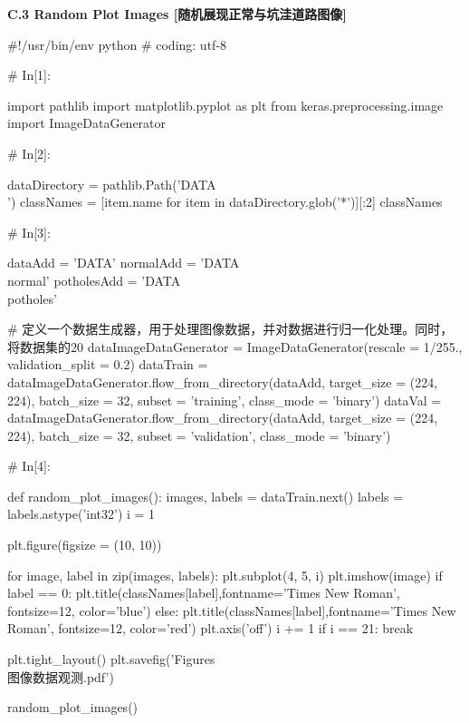 \documentclass{MathorCupmodeling}
\begin{document}
\textbf{C.3 Random Plot Images [随机展现正常与坑洼道路图像]}
\begin{python}
#!/usr/bin/env python
# coding: utf-8

# In[1]:


import pathlib
import matplotlib.pyplot as plt
from keras.preprocessing.image import ImageDataGenerator


# In[2]:


dataDirectory = pathlib.Path('DATA\\')
classNames = [item.name for item in dataDirectory.glob('*')][:2]
classNames


# In[3]:


dataAdd = 'DATA' 
normalAdd = 'DATA\\normal'
potholesAdd = 'DATA\\potholes'

# 定义一个数据生成器，用于处理图像数据，并对数据进行归一化处理。同时，将数据集的20%
dataImageDataGenerator = ImageDataGenerator(rescale = 1/255., validation_split = 0.2)
dataTrain = dataImageDataGenerator.flow_from_directory(dataAdd, target_size = (224, 224), batch_size = 32, subset = 'training', class_mode = 'binary')
dataVal = dataImageDataGenerator.flow_from_directory(dataAdd, target_size = (224, 224), batch_size = 32, subset = 'validation', class_mode = 'binary')


# In[4]:


def random_plot_images():
    images, labels = dataTrain.next()
    labels = labels.astype('int32')
    i = 1

    plt.figure(figsize = (10, 10))
    
    for image, label in zip(images, labels):
        plt.subplot(4, 5, i)
        plt.imshow(image)
        if label == 0:
            plt.title(classNames[label],fontname='Times New Roman', fontsize=12, color='blue')
        else:
            plt.title(classNames[label],fontname='Times New Roman', fontsize=12, color='red')
        plt.axis('off')
        i += 1
        if i == 21:
            break

    plt.tight_layout()       
    plt.savefig('Figures\\图像数据观测.pdf')


random_plot_images()

\end{python}
\end{document}
